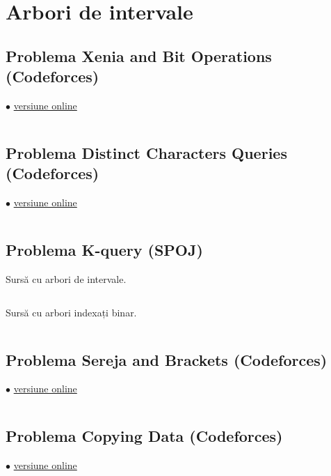 \documentclass[../main.tex]{subfiles}
\begin{document}
\chapter{Arbori de intervale}

\section{Problema Xenia and Bit Operations (Codeforces)}
\label{code:xenia-and-bit-operations}
$\bullet$
\href{https://codeforces.com/contest/339/submission/280956091}{versiune online}

\inputminted{cpp}{../src/segment-trees/xenia-and-bit-operations.cpp}

\section{Problema Distinct Characters Queries (Codeforces)}
\label{code:distinct-characters-queries}
$\bullet$
\href{https://codeforces.com/contest/1234/submission/341304487}{versiune online}

\inputminted{cpp}{../src/segment-trees/distinct-characters-queries.cpp}

\section{Problema K-query (SPOJ)}
\label{code:k-query}

Sursă cu arbori de intervale.

\inputminted{cpp}{../src/segment-trees/k-query.cpp}

Sursă cu arbori indexați binar.

\inputminted{cpp}{../src/fenwick-trees/k-query.cpp}

\section{Problema Sereja and Brackets (Codeforces)}
\label{code:sereja-and-brackets}
$\bullet$
\href{https://codeforces.com/contest/380/submission/280972559}{versiune online}

\inputminted{cpp}{../src/segment-trees/sereja-and-brackets.cpp}

\section{Problema Copying Data (Codeforces)}
\label{code:copying-data}
$\bullet$
\href{https://codeforces.com/contest/292/submission/281463235}{versiune online}
\end{document}
